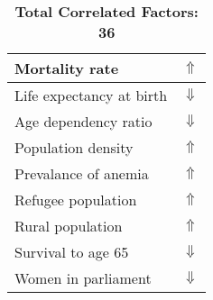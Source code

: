\documentclass[12pt,notitlepage,oneside]{report}
\begin{document}
\begin{table}[!htb]
\begin{tabular}{|l|l|}
Mortality rate & $\Uparrow$\\ \hline
Life expectancy at birth & $\Downarrow$\\ \hline
Age dependency ratio & $\Downarrow$\\ \hline
Population density & $\Uparrow$\\ \hline
Prevalance of anemia & $\Uparrow$\\ \hline
Refugee population & $\Uparrow$\\ \hline
Rural population & $\Uparrow$\\ \hline
Survival to age 65 & $\Downarrow$\\ \hline
Women in parliament & $\Downarrow$\\ \hline
\end{tabular}
\caption*{\textbf{Total Correlated Factors: 36}}
\end{table}
\clearpage
\end{document}
